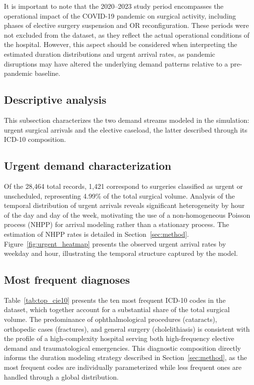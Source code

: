 \documentclass[sn-mathphys-num]{sn-jnl}
\begin{document}
It is important to note that the 2020--2023 study period encompasses
the operational impact of the COVID-19 pandemic on surgical activity,
including phases of elective surgery suspension and OR reconfiguration. These periods were not excluded from the dataset,
as they reflect the actual operational conditions of the hospital.
However, this aspect should be considered when interpreting the
estimated duration distributions and urgent arrival rates, as pandemic
disruptions may have altered the underlying demand patterns relative
to a pre-pandemic baseline.

\subsection{Descriptive analysis}\label{descriptive-statistics}

This subsection characterizes the two demand streams modeled in the
simulation: urgent surgical arrivals and the elective caseload,
the latter described through its ICD-10 composition.

\subsection*{Urgent demand characterization}

Of the 28{,}464 total records, 1{,}421 correspond to surgeries
classified as urgent or unscheduled, representing 4.99\% of the total
surgical volume. Analysis of the temporal distribution of urgent
arrivals reveals significant heterogeneity by hour of the day and day
of the week, motivating the use of a
non-homogeneous Poisson process (NHPP) for arrival modeling rather
than a stationary process. The estimation of NHPP rates is detailed
in Section~\ref{sec:method}. Figure~\ref{fig:urgent_heatmap} presents
the observed urgent arrival rates by weekday and hour, illustrating
the temporal structure captured by the model.

\subsection*{Most frequent diagnoses}

Table~\ref{tab:top_cie10} presents the ten most frequent ICD-10 codes
in the dataset, which together account for a substantial share of the
total surgical volume. The predominance of ophthalmological procedures
(cataracts), orthopedic cases (fractures), and general surgery
(cholelithiasis) is consistent with the profile of a high-complexity
hospital serving both high-frequency elective demand and traumatological
emergencies. This diagnostic composition directly informs the duration
modeling strategy described in Section~\ref{sec:method}, as the most
frequent codes are individually parameterized while less frequent ones
are handled through a global distribution.
\end{document}
